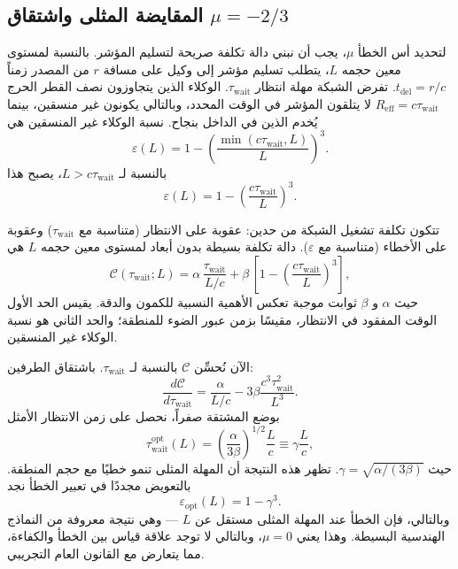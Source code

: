 \documentclass[11pt,a4paper]{article}
\begin{document}
	\subsection{المقايضة المثلى واشتقاق \(\mu = -2/3\)}
	لتحديد أس الخطأ \(\mu\)، يجب أن نبني دالة تكلفة صريحة لتسليم المؤشر. بالنسبة لمستوى معين حجمه \(L\)، يتطلب تسليم مؤشر إلى وكيل على مسافة \(r\) من المصدر زمناً \(t_{\mathrm{del}} = r/c\). تفرض الشبكة مهلة انتظار \(\tau_{\mathrm{wait}}\). الوكلاء الذين يتجاوزون نصف القطر الحرج \(R_{\mathrm{eff}} = c\tau_{\mathrm{wait}}\) لا يتلقون المؤشر في الوقت المحدد، وبالتالي يكونون غير منسقين، بينما يُخدم الذين في الداخل بنجاح. نسبة الوكلاء غير المنسقين هي
	\[
	\varepsilon(L) = 1 - \left(\frac{\min(c\tau_{\mathrm{wait}},L)}{L}\right)^3.
	\]
	بالنسبة لـ \(L > c\tau_{\mathrm{wait}}\)، يصبح هذا
	\[
	\varepsilon(L) = 1 - \left(\frac{c\tau_{\mathrm{wait}}}{L}\right)^3.
	\]
	
	تتكون تكلفة تشغيل الشبكة من حدين: عقوبة على الانتظار (متناسبة مع \(\tau_{\mathrm{wait}}\)) وعقوبة على الأخطاء (متناسبة مع \(\varepsilon\)). دالة تكلفة بسيطة بدون أبعاد لمستوى معين حجمه \(L\) هي
	\begin{equation}
		\mathcal{C}(\tau_{\mathrm{wait}}; L) = \alpha\, \frac{\tau_{\mathrm{wait}}}{L/c} + \beta\,\left[1 - \left(\frac{c\tau_{\mathrm{wait}}}{L}\right)^3\right],
		\label{eq:cost}
	\end{equation}
	حيث \(\alpha\) و \(\beta\) ثوابت موجبة تعكس الأهمية النسبية للكمون والدقة. يقيس الحد الأول الوقت المفقود في الانتظار، مقيسًا بزمن عبور الضوء للمنطقة؛ والحد الثاني هو نسبة الوكلاء غير المنسقين.
	
	الآن نُحسِّن \(\mathcal{C}\) بالنسبة لـ \(\tau_{\mathrm{wait}}\). باشتقاق الطرفين:
	\[
	\frac{d\mathcal{C}}{d\tau_{\mathrm{wait}}} = \frac{\alpha}{L/c} - 3\beta \frac{c^3\tau_{\mathrm{wait}}^2}{L^3}.
	\]
	بوضع المشتقة صفراً، نحصل على زمن الانتظار الأمثل
	\[
	\tau_{\mathrm{wait}}^{\mathrm{opt}}(L) = \left(\frac{\alpha}{3\beta}\right)^{1/2} \frac{L}{c} \equiv \gamma \frac{L}{c},
	\]
	حيث \(\gamma = \sqrt{\alpha/(3\beta)}\). تظهر هذه النتيجة أن المهلة المثلى تنمو خطيًا مع حجم المنطقة. بالتعويض مجددًا في تعبير الخطأ نجد
	\[
	\varepsilon_{\mathrm{opt}}(L) = 1 - \gamma^3.
	\]
	وبالتالي، فإن الخطأ عند المهلة المثلى مستقل عن \(L\) — وهي نتيجة معروفة من النماذج الهندسية البسيطة. وهذا يعني \(\mu = 0\)، وبالتالي لا توجد علاقة قياس بين الخطأ والكفاءة، مما يتعارض مع القانون العام التجريبي.
	
\end{document}
